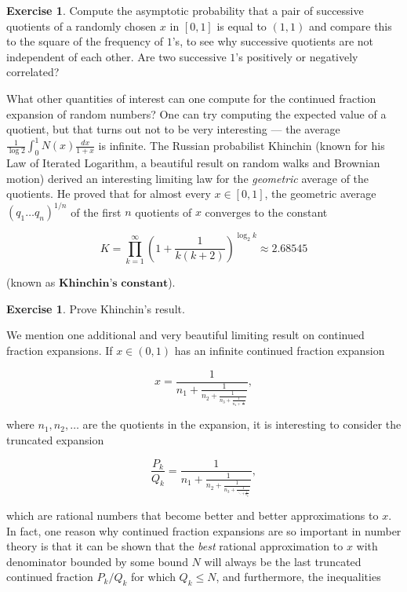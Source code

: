 \documentclass[11pt]{report}
\theoremstyle{plain}
\theoremstyle{definition}
\newtheorem{xexercise}[thm]{Exercise}
\begin{document}
\begin{enumerate}[label=\arabic*.]
\begin{xexercise}
Compute the asymptotic probability that a pair of successive quotients of a randomly chosen $x$ in $[0,1]$ is equal to $(1,1)$ and compare this to the square of the frequency of $1$'s, to see why successive quotients are not independent of each other. Are two successive $1$'s positively or negatively correlated?
\end{xexercise}

What other quantities of interest can one compute for the continued fraction expansion of random numbers? One can try computing the expected value of a quotient, but that turns out not to be very interesting --- the average $\frac{1}{\log 2} \int_0^1 N(x) \frac{dx}{1+x}$ is infinite. The Russian probabilist Khinchin (known for his Law of Iterated Logarithm, a beautiful result on random walks and Brownian motion) derived an interesting limiting law for the \emph{geometric} average of the quotients. He proved that for almost every $x\in[0,1]$, the geometric average $(q_1\ldots q_n)^{1/n}$ of the first $n$ quotients of $x$ converges to the constant

\[
K = \prod_{k=1}^\infty \left( 1+\frac{1}{k(k+2)} \right)^{\log_2 k} \approx 2.68545
\]

(known as $\textbf{Khinchin's constant}$).

\begin{xexercise}
Prove Khinchin's result.
\end{xexercise}

We mention one additional and very beautiful limiting result on continued fraction expansions. If $x\in (0,1)$ has an infinite continued fraction expansion

\[
x = \frac{1}{n_1+\frac{1}{n_2+\frac{1}{n_3+\frac{1}{n_4+\frac{1}{\ldots}}}}},
\]

where $n_1,n_2,\ldots$ are the quotients in the expansion, it is interesting to consider the truncated expansion

\[
\frac{P_k}{Q_k} = \frac{1}{n_1+\frac{1}{n_2+\frac{1}{n_3+\frac{1}{\ddots+\frac{1}{n_k}}}}},
\]

which are rational numbers that become better and better approximations to $x$. In fact, one reason why continued fraction expansions are so important in number theory is that it can be shown that the \emph{best} rational approximation to $x$ with denominator bounded by some bound $N$ will always be the last truncated continued fraction $P_k/Q_k$ for which $Q_k\le N$, and furthermore, the inequalities


\end{enumerate}
\end{document}
